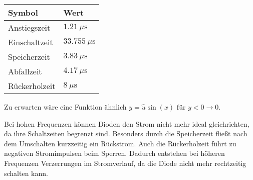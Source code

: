 \documentclass[
	a4paper, %
	12pt, %
]{CSUniSchoolLabReport}
\newcommand{\micro}{\ensuremath{\mu}}
\begin{document}
\vspace{1em} 

\begin{center}
\begin{tabular}{ll}
\toprule
\textbf{Symbol} & \textbf{Wert} \\
\midrule
Anstiegszeit      & $\SI{1.21}{\micro\second}$ \\
Einschaltzeit     & $\SI{33.755}{\micro\second}$ \\
Speicherzeit      & $\SI{3.83}{\micro\second}$\\
Abfallzeit        & $\SI{4.17}{\micro\second}$  \\
Rückerholzeit     & $\SI{8}{\micro\second}$ \\
\bottomrule
\end{tabular}
\end{center}

\vspace{1em} 

Zu erwarten wäre eine Funktion ähnlich $y = \hat{u}\sin(x) \text{ für } y < 0 \rightarrow 0$.\par
Bei hohen Frequenzen können Dioden den Strom nicht mehr ideal gleichrichten, da ihre Schaltzeiten begrenzt sind. Besonders durch die Speicherzeit fließt nach dem Umschalten kurzzeitig ein Rückstrom. Auch die Rückerholzeit führt zu negativen Stromimpulsen beim Sperren. Dadurch entstehen bei höheren Frequenzen Verzerrungen im Stromverlauf, da die Diode nicht mehr rechtzeitig schalten kann.

\end{document}
